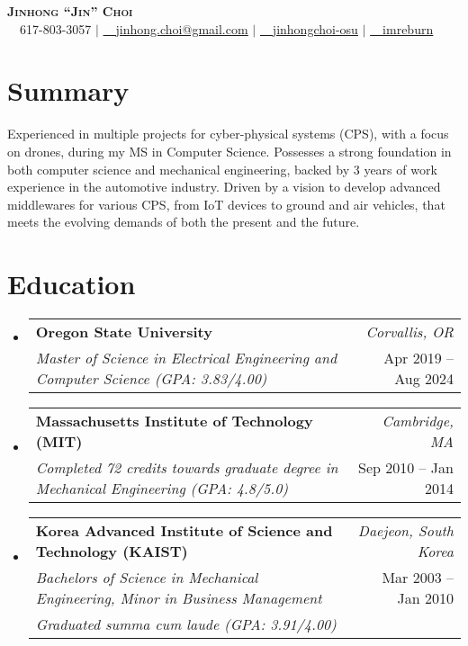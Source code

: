 \documentclass[letterpaper,10pt]{article}
\makeatletter
\newcommand{\resumeSubheadingNew}[4]{
  \vspace{-2pt}\item
    \begin{tabular*}{0.97\textwidth}[t]{l@{\extracolsep{\fill}}r}
      \textbf{#1} & \textit{\small #2} \\
      \textit{\small#3} & \small #4 \\
    \end{tabular*}\vspace{-6pt}
}
\newcommand{\resumeSubheadingNewLine}[5]{
  \vspace{-2pt}\item
    \begin{tabular*}{0.97\textwidth}[t]{l@{\extracolsep{\fill}}r}
      \textbf{#1} & \textit{\small #2} \\
      \textit{\small#3} & \small #4 \\
      \textit{\small#5} & \\
    \end{tabular*}\vspace{-6pt}
}
\newcommand{\resumeSubHeadingListStart}{\begin{itemize}[leftmargin=0.15in, label={}]}
\newcommand{\resumeSubHeadingListEnd}{\end{itemize}}
\makeatother
\begin{document}

\begin{center}
    \textbf{\Huge \scshape Jinhong ``Jin'' Choi} \\ \vspace{5pt}
    \small \faMobile~~617-803-3057 $|$ \href{mailto:jinhong.choi@gmail.com}{\faEnvelope~~\underline{jinhong.choi@gmail.com}} $|$ 
    \href{https://linkedin.com/in/jinhongchoi-osu}{\faLinkedin~~\underline{jinhongchoi-osu}} $|$
    \href{https://github.com/imreburn}{\faGithub~~\underline{imreburn}}
\end{center}

\section{Summary}
\begin{itemize}[leftmargin=0.15in, label={}, rightmargin=0.15in]
\small{\item{Experienced in multiple projects for cyber-physical systems (CPS), with a focus on drones, during my MS in Computer Science. Possesses a strong foundation in both computer science and mechanical engineering, backed by 3 years of work experience in the automotive industry. Driven by a vision to develop advanced middlewares for various CPS, from IoT devices to ground and air vehicles, that meets the evolving demands of both the present and the future.}}
\end{itemize}

\section{Education}
  \resumeSubHeadingListStart
    \resumeSubheadingNew
      {Oregon State University}{Corvallis, OR}
      {Master of Science in  Electrical Engineering and Computer Science (GPA: 3.83/4.00)}{Apr 2019 -- Aug 2024}
    \resumeSubheadingNew
      {Massachusetts Institute of Technology (MIT)}{Cambridge, MA}
      {Completed 72 credits towards graduate degree in Mechanical Engineering (GPA: 4.8/5.0)}{Sep 2010 -- Jan 2014}
    \resumeSubheadingNewLine
      {Korea Advanced Institute of Science and Technology (KAIST)}{Daejeon, South Korea}
      {Bachelors of Science in Mechanical Engineering, Minor in Business Management}{Mar 2003 -- Jan 2010}{Graduated summa cum laude (GPA: 3.91/4.00)}
  \resumeSubHeadingListEnd
\end{document}
